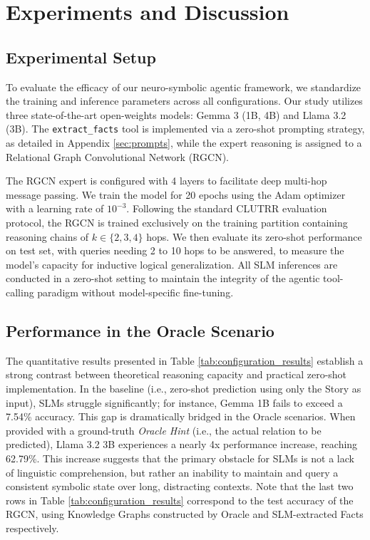 \documentclass[
]{ceurart}
\begin{document}
\section{Experiments and Discussion}\label{sec:experiments}

\subsection{Experimental Setup}
To evaluate the efficacy of our neuro-symbolic agentic framework, we standardize the training and inference parameters across all configurations. Our study utilizes three state-of-the-art open-weights models: Gemma 3 (1B, 4B) and Llama 3.2 (3B). The \texttt{extract\_facts} tool is implemented via a zero-shot prompting strategy, as detailed in Appendix \ref{sec:prompts}, while the expert reasoning is assigned to a Relational Graph Convolutional Network (RGCN).

\noindent The RGCN expert is configured with 4 layers to facilitate deep multi-hop message passing. We train the model for 20 epochs using the Adam optimizer with a learning rate of $10^{-3}$. Following the standard CLUTRR evaluation protocol, the RGCN is trained exclusively on the training partition containing reasoning chains of $k \in \{2, 3, 4\}$ hops. We then evaluate its zero-shot performance on test set, with
queries needing 2 to 10 hops to be answered, to measure the model's capacity for inductive logical generalization. All SLM inferences are conducted in a zero-shot setting to maintain the integrity of the agentic tool-calling paradigm without model-specific fine-tuning.

\subsection{Performance in the Oracle Scenario}
The quantitative results presented in Table \ref{tab:configuration_results} establish a strong contrast between theoretical reasoning capacity and practical zero-shot implementation. In the baseline  (i.e., zero-shot prediction using only the Story as input), SLMs struggle significantly; for instance, Gemma 1B fails to exceed a 7.54\% accuracy. This gap is dramatically bridged in the Oracle scenarios. When provided with a ground-truth \textit{Oracle Hint} (i.e., the actual relation to be predicted), Llama 3.2 3B experiences a nearly 4x performance increase, reaching 62.79\%. This increase suggests that the primary obstacle for SLMs is not a lack of linguistic comprehension, but rather an inability to maintain and query a consistent symbolic state over long, distracting contexts. Note that the last two rows in Table \ref{tab:configuration_results} correspond to the test accuracy of the RGCN, using Knowledge Graphs constructed by Oracle and SLM-extracted Facts respectively.
\end{document}
